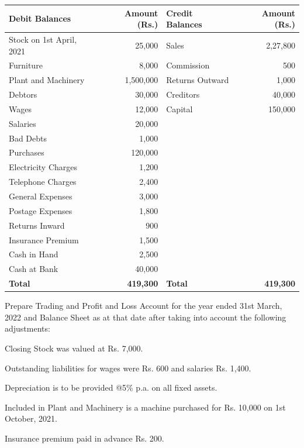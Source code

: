\documentclass[11pt,a4paper]{article}
\begin{document}
\begin{center}
  \small
  
\begin{tabular}{|l|r||l|r|}
    \hline
   \textbf{Debit Balances} &   \textbf{Amount (Rs.)} &   \textbf{Credit Balances} &   \textbf{Amount (Rs.)} \\
    \hline
    Stock on 1st April, 2021 & 25,000 & Sales & 2,27,800 \\
    Furniture & 8,000 & Commission & 500 \\
    Plant and Machinery & 1,500,000 & Returns Outward & 1,000 \\
    Debtors & 30,000 & Creditors & 40,000 \\
    Wages & 12,000 & Capital & 150,000 \\
    Salaries & 20,000 & & \\
    Bad Debts & 1,000 & & \\
    Purchases & 120,000 & & \\
    Electricity Charges & 1,200 & & \\
    Telephone Charges & 2,400 & & \\
    General Expenses & 3,000 & & \\
    Postage Expenses & 1,800 & & \\
    Returns Inward & 900 & & \\
    Insurance Premium & 1,500 & & \\
    Cash in Hand & 2,500 & & \\
    Cash at Bank & 40,000 & & \\
    \hline
   \textbf{Total} &   \textbf{419,300} &   \textbf{Total} &   \textbf{419,300} \\
    \hline
  \end{tabular}
\end{center}
Prepare Trading and Profit and Loss Account for the year ended 31st March, 2022 and Balance Sheet as at that date after taking into account the following adjustments:

\begin{parts}
  \item Closing Stock was valued at Rs. 7,000.
  \item Outstanding liabilities for wages were Rs. 600 and salaries Rs. 1,400.
  \item Depreciation is to be provided @5\% p.a. on all fixed assets.
  \item Included in Plant and Machinery is a machine purchased for Rs. 10,000 on 1st October, 2021.
  \item Insurance premium paid in advance Rs. 200.
\end{parts}
\end{document}
